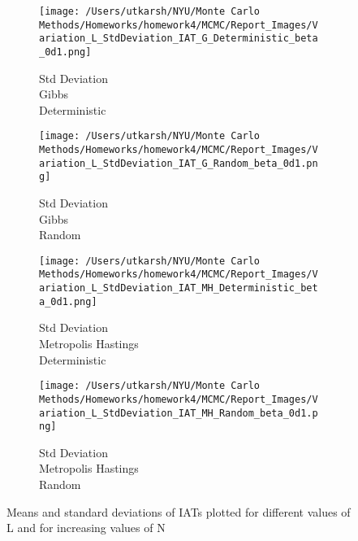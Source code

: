 \documentclass[11pt]{article}
\begin{document}
\begin{figure}[H]
	\begin{subfigure}{.23\textwidth}
		\texttt{[image: /Users/utkarsh/NYU/Monte Carlo Methods/Homeworks/homework4/MCMC/Report\_Images/Variation\_L\_StdDeviation\_IAT\_G\_Deterministic\_beta\_0d1.png]}
		\caption{Std Deviation\\Gibbs\\Deterministic}
	\end{subfigure}
	\begin{subfigure}{.23\textwidth}
		\texttt{[image: /Users/utkarsh/NYU/Monte Carlo Methods/Homeworks/homework4/MCMC/Report\_Images/Variation\_L\_StdDeviation\_IAT\_G\_Random\_beta\_0d1.png]}
		\caption{Std Deviation\\Gibbs\\Random}
	\end{subfigure}
	\begin{subfigure}{.23\textwidth}
		\texttt{[image: /Users/utkarsh/NYU/Monte Carlo Methods/Homeworks/homework4/MCMC/Report\_Images/Variation\_L\_StdDeviation\_IAT\_MH\_Deterministic\_beta\_0d1.png]}
		\caption{Std Deviation\\Metropolis Hastings\\Deterministic}
	\end{subfigure}
	\begin{subfigure}{.23\textwidth}
		\texttt{[image: /Users/utkarsh/NYU/Monte Carlo Methods/Homeworks/homework4/MCMC/Report\_Images/Variation\_L\_StdDeviation\_IAT\_MH\_Random\_beta\_0d1.png]}
		\caption{Std Deviation\\Metropolis Hastings\\Random}
	\end{subfigure}
	\caption{Means and standard deviations of IATs plotted for different values of L and for increasing values of N}
	\label{fig:variation_with_ls}
\end{figure}
\end{document}
